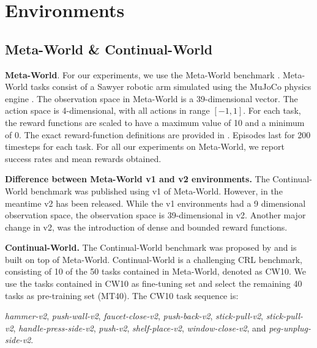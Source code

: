 
\appendix
\section{Environments} \label{appendix:environments}
\subsection{Meta-World \& Continual-World}
\textbf{Meta-World}. For our experiments, we use the Meta-World benchmark \citep{Yu:22}. Meta-World tasks consist of a Sawyer robotic arm simulated using the MuJoCo physics engine \citep{Todorov:12}. 
The observation space in Meta-World is a 39-dimensional vector.
The action space is 4-dimensional, with all actions in range $[-1, 1]$.
For each task, the reward functions are scaled to have a maximum value of 10 and a minimum of 0. The exact reward-function definitions are provided in \citet{Yu:22}. Episodes last for 200 timesteps for each task. For all our experiments on Meta-World, we report success rates and mean rewards obtained. 

\textbf{Difference between Meta-World v1 and v2 environments.} The Continual-World benchmark was published using v1 of Meta-World. However, in the meantime v2 has been released. While the v1 environments had a 9 dimensional observation space, the observation space is 39-dimensional in v2. Another major change in v2, was the introduction of dense and bounded reward functions. 

\textbf{Continual-World.}
The Continual-World benchmark was proposed by \citet{Wolczyk:21} and is built on top of Meta-World.
Continual-World is a challenging CRL benchmark, consisting of 10 of the 50 tasks contained in Meta-World, denoted as CW10. We use the tasks contained in CW10 as fine-tuning set and select the remaining 40 tasks as pre-training set (MT40). The CW10 task sequence is:

\textit{hammer-v2}, \textit{push-wall-v2}, \textit{faucet-close-v2}, \textit{push-back-v2}, \textit{stick-pull-v2}, \textit{stick-pull-v2}, \textit{handle-press-side-v2}, \textit{push-v2}, \textit{shelf-place-v2}, 
\textit{window-close-v2}, and \textit{peg-unplug-side-v2}. 

